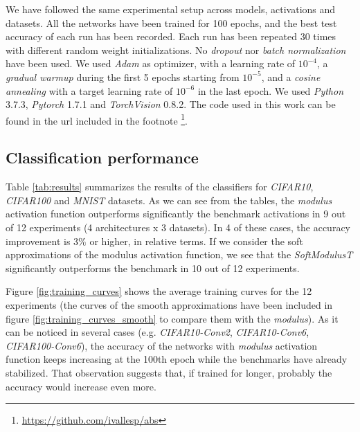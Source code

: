 We have followed the same experimental setup across models, activations and datasets. All the networks have been trained for 100 epochs, and the best test accuracy of each run has been recorded. Each run has been repeated 30 times with different random weight initializations. No \textit{dropout} \cite{Srivastava2014} nor \textit{batch normalization} \cite{Ioffe2015} have been used. We used \textit{Adam} \cite{Kingma14} as optimizer, with a learning rate of $10^{-4}$, a \textit{gradual warmup} \cite{gotmare2018} during the first 5 epochs starting from $10^{-5}$, and a \textit{cosine annealing} \cite{loshchilov2017} with a target learning rate of $10^{-6}$ in the last epoch. We used \textit{Python} 3.7.3, \textit{Pytorch} 1.7.1 and  \textit{TorchVision} 0.8.2. The code used in this work can be found in the url included in the footnote \footnote{\url{https://github.com/ivallesp/abs}}. 


\subsection{Classification performance}
Table \ref{tab:results} summarizes the results of the classifiers for \textit{CIFAR10}, \textit{CIFAR100} and \textit{MNIST} datasets. As we can see from the tables, the \textit{modulus} activation function outperforms significantly the benchmark activations in 9 out of 12 experiments (4 architectures x 3 datasets). In 4 of these cases, the accuracy improvement is $3\%$ or higher, in relative terms. If we consider the soft approximations of the modulus activation function, we see that the \textit{SoftModulusT} significantly outperforms the benchmark in 10 out of 12 experiments.

Figure \ref{fig:training_curves} shows the average training curves for the 12 experiments (the curves of the smooth approximations have been included in figure \ref{fig:training_curves_smooth} to compare them with the \textit{modulus}). As it can be noticed in several cases (e.g. \textit{CIFAR10-Conv2}, \textit{CIFAR10-Conv6}, \textit{CIFAR100-Conv6}), the accuracy of the networks with \textit{modulus} activation function keeps increasing at the 100th epoch while the benchmarks have already stabilized. That observation suggests that, if trained for longer, probably the accuracy would increase even more. 


